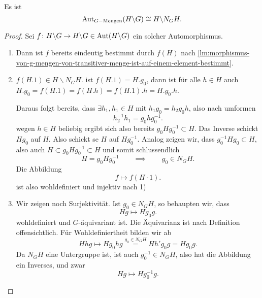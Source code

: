 \begin{proposition}
    Es ist
    \[
        \operatorname{Aut}_{G-\text{Mengen}}(H \backslash G) \cong H \backslash N_GH
    .\] 
\end{proposition}
\begin{proof}
    Sei $f\colon  H \backslash G \to  H \backslash G\in \operatorname{Aut} (H \backslash G)$ ein solcher Automorphismus.
    \begin{enumerate}[1)]
    \item Dann ist $f$ bereits eindeutig bestimmt durch  $f(H)$ nach \autoref{lm:morphismus-von-g-mengen-von-transitiver-menge-ist-auf-einem-element-bestimmt}.
    \item $f(H.1) \in H \backslash N_GH$. ist $f(H.1) = H.g_0$, dann ist für alle $h\in H$ auch $H.g_0 = f(H.1) = f(H.h) = f(H.1).h = H.g_0.h$.

        Daraus folgt bereits, dass $\exists h_1,h_1 \in H$ mit $h_1g_0 = h_2g_0h$, also nach umformen
        \[
       h_2^{-1}h_1 = g_0hg_0^{-1}
        .\] 
        wegen $h\in H$ beliebig ergibt sich also bereits $g_0Hg_0^{-1}\subset H$. Das Inverse schickt $Hg_0$ auf $H$. Also schickt se  $H$ auf  $Hg_0^{-1}$. Analog zeigen wir, dass $g_0^{-1}Hg_0 \subset H$, also auch $H\subset g_0Hg_0^{-1}\subset H$ und somit schlussendlich
        \[
        H = g_0Hg_0^{-1} \qquad \implies \qquad g_0\in N_GH
        .\] 
        Die Abbildung
        \[
            f \mapsto f(H\cdot 1)
        .\] 
        ist also wohldefiniert und injektiv nach 1)

    \item Wir zeigen noch Surjektivität. Ist $g_0\in N_GH$, so behaupten wir, dass
        \[
        Hg \mapsto Hg_0g
        .\] 
        wohldefiniert und $G$-äquivariant ist. Die Äquivarianz ist nach Definition offensichtlich. Für Wohldefiniertheit bilden wir ab
         \[
             Hhg \mapsto H g_0hg \stackrel{g_0\in N_GH}{=} H h'g_0g = Hg_0g
        .\] 
        Da $N_GH$ eine Untergruppe ist, ist auch  $g_0^{-1}\in N_GH$, also hat die Abbildung ein Inverses, und zwar
        \[
        Hg \mapsto Hg_0^{-1}g
        .\] 
\end{enumerate}
\end{proof}

